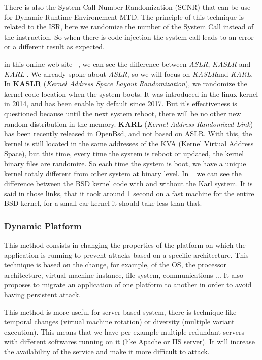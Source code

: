There is also the System Call Number Randomization (SCNR) that can be
use for Dynamic Runtime Environement MTD. The principle of this
technique is related to the ISR, here we randomize the number of the
System Call instead of the instruction. So when there is code
injection the system call leads to an error or a different result as
expected.

in this online web site ~\cite{daniel_2017}, we can see the difference
between \emph{ASLR}, \emph{KASLR} and \emph{KARL} . We already spoke about \emph{ASLR}, so
we will focus on \emph{KASLR}and \emph{KARL}. \newline
In \textbf{KASLR} (\emph{Kernel Address Space Layout Randomization}), we randomize the
kernel code location when the system boots. It was introduced in the
linux kernel in 2014, and has been enable by default since 2017. But
it's effectiveness is questioned because until the next
system reboot, there will be no other new random distribution in the
memory. \newline
 \textbf{KARL} (\emph{Kernel Address Randomized Link}) ~\cite{karl} has been recently
released in OpenBsd, and not based on ASLR. With this, the kernel is
still located in the same addresses of the KVA (Kernel Virtual Address
Space), but this time, every time the system is reboot or updated, the
kernel binary files are randomize. So each time the system is boot, we
have a unique kernel totaly different from other system at binary
level. In ~\cite{rekarl} we can see the difference between the BSD kernel code
with and without the Karl system. It is said in those links, that it
took around 1 second on a fast machine for the entire BSD kernel, for
a small car kernel it should take less than that.


\subsubsection{ Dynamic Platform}


This method consists in changing the properties of the platform on
which the application is running to prevent attacks based on a specific
architecture. This technique is based on the change, for example, of
the OS, the processor architecture, virtual machine instance, file
system, communications ... It also proposes to migrate an application
of one platform to another in order to avoid having persistent attack.

This method is more useful for server based system, there is technique
like temporal changes (virtual machine rotation) or diversity
(multiple variant execution). This means that we have per example
multiple redundant servers with different softwares running on it (like
Apache or IIS server). It will increase the availability of the
service and make it more difficult to attack.

